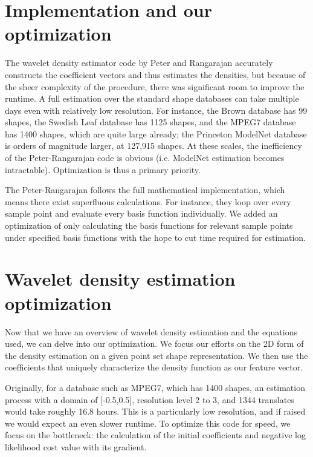 \documentclass[../tech_report_1.tex]{subfiles}
\begin{document}
\section{Implementation and our optimization}

The wavelet density estimator code by Peter and Rangarajan accurately constructs the coefficient vectors and thus estimates the densities, but because of the sheer complexity of the procedure, there was significant room to improve the runtime. A full estimation over the standard shape databases can take multiple days even with relatively low resolution.
For instance, the Brown database \cite{sebastian2004recognition} has 99 shapes, the Swedish Leaf database \cite{soderkvist2001computer} has 1125 shapes, and the MPEG7 database \cite{jeannin1999description, bober2001mpeg} has 1400 shapes, which are quite large already; the Princeton ModelNet database is orders of magnitude larger, at 127,915 shapes. At these scales, the inefficiency of the Peter-Rangarajan code is obvious (i.e. ModelNet estimation becomes intractable). Optimization is thus a primary priority.

The Peter-Rangarajan follows the full mathematical implementation, which means there exist superfluous calculations. For instance, they loop over every sample point and evaluate every basis function individually. We added an optimization of only calculating the basis functions
for relevant sample points under specified basis functions with the
hope to cut time required for estimation.

\section{Wavelet density estimation optimization}

Now that we have an overview of wavelet density estimation and the
equations used, we can delve into our optimization. We focus our efforts on the 2D form of the density estimation on a given point set shape representation.
We then use the coefficients that uniquely characterize the density
function as our feature vector. 

Originally, for a database such as
MPEG7, which has 1400 shapes, an estimation process with a domain of {[}-0.5,0.5{]}, resolution
level 2 to 3, and 1344 translates would take roughly 16.8 hours.
This is a particularly low resolution, and if raised we would expect
an even slower runtime. To optimize this code for speed, we focus on the
bottleneck: the calculation of the initial coefficients and negative
log likelihood cost value with its gradient. 
\end{document}
